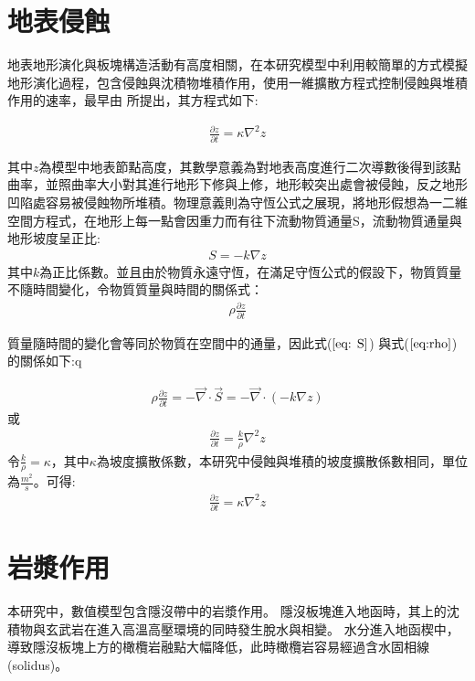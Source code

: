 \section{地表侵蝕}
地表地形演化與板塊構造活動有高度相關，在本研究模型中利用較簡單的方式模擬地形演化過程，包含侵蝕與沈積物堆積作用，使用一維擴散方程式控制侵蝕與堆積作用的速率，最早由\citealp{culling1960analytical} 所提出，其方程式如下:

\begin{align}
\frac{\partial z}{\partial t} = \kappa \nabla^2 z \label{eq: erosion}
\end{align}

其中$z$為模型中地表節點高度，其數學意義為對地表高度進行二次導數後得到該點曲率，並照曲率大小對其進行地形下修與上修，地形較突出處會被侵蝕，反之地形凹陷處容易被侵蝕物所堆積。物理意義則為守恆公式之展現，將地形假想為一二維空間方程式，在地形上每一點會因重力而有往下流動物質通量S，流動物質通量與地形坡度呈正比:
\begin{align}
S = -k\nabla z \label{eq: S}
\end{align}
其中$k$為正比係數。並且由於物質永遠守恆，在滿足守恆公式的假設下，物質質量不隨時間變化，令物質質量與時間的關係式：
\begin{align}
\rho\frac{\partial z}{\partial t}\label{eq:rho}
\end{align}

質量隨時間的變化會等同於物質在空間中的通量，因此式($\ref{eq: S}$) 與式($\ref{eq:rho}$) 的關係如下:q 

\begin{align}
\rho\frac{\partial z}{\partial t} = -\vec\nabla\cdot \vec S = -\vec\nabla \cdot (-k\nabla z)\label{eq:erosion2}
\end{align}
或
\begin{align}
\frac{\partial z}{\partial t} = \frac{k}{\rho}\nabla^2 z\label{eq:erosion3}
\end{align}
令$\frac{k}{\rho}=\kappa$，其中$\kappa$為坡度擴散係數，本研究中侵蝕與堆積的坡度擴散係數相同，單位為$\frac{m^2}{s}$。可得:
\begin{align}
\frac{\partial z}{\partial t} = \kappa\nabla^2 z\label{eq:erosion4}
\end{align}

\section{岩漿作用}
本研究中，數值模型包含隱沒帶中的岩漿作用。
隱沒板塊進入地函時，其上的沈積物與玄武岩在進入高溫高壓環境的同時發生脫水與相變。
水分進入地函楔中，導致隱沒板塊上方的橄欖岩融點大幅降低，此時橄欖岩容易經過含水固相線(solidus)。